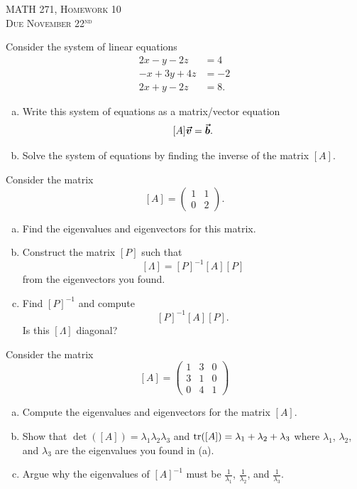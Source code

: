 \documentclass[12pt]{article} %
\begin{document}
\begin{center}
   \textsc{\large MATH 271, Homework 10}\\
   \textsc{Due November 22$^\textrm{nd}$}
\end{center}
\vspace{.5cm}

\begin{problem}
Consider the system of linear equations
\begin{align*}
    2x-y-2z&=4\\
    -x + 3y +4z &= -2\\
    2x+y-2z&=8.
\end{align*}
\begin{enumerate}[(a)]
    \item Write this system of equations as a matrix/vector equation
    \[
    [A]\boldsymbol{\vec{v}}=\boldsymbol{\vec{b}}.
    \]
    \item Solve the system of equations by finding the inverse of the matrix $[A]$.
\end{enumerate}
\end{problem}

\begin{problem}
Consider the matrix
\[
[A] = \begin{pmatrix} 1 & 1 \\ 0 & 2 \end{pmatrix}.
\]
\begin{enumerate}[(a)]
    \item Find the eigenvalues and eigenvectors for this matrix.
    \item Construct the matrix $[P]$ such that
    \[
    [\Lambda] = [P]^{-1}[A][P]
    \]
    from the eigenvectors you found. 
    \item Find $[P]^{-1}$ and compute
    \[
    [P]^{-1}[A][P].
    \]
    Is this $[\Lambda]$ diagonal?
\end{enumerate} 
\end{problem}

\begin{problem}
Consider the matrix
\[
[A]=\begin{pmatrix} 1 & 3 & 0 \\ 3 & 1 & 0 \\
 0 & 4 & 1 \end{pmatrix}
\]
\begin{enumerate}[(a)]
    \item Compute the eigenvalues and eigenvectors for the matrix $[A]$.
    \item Show that $\det([A])=\lambda_1\lambda_2\lambda_3$ and $\mathrm{tr}([A])=\lambda_1 + \lambda_2+\lambda_3$ where $\lambda_1$, $\lambda_2$, and $\lambda_3$ are the eigenvalues you found in (a).
    \item Argue why the eigenvalues of $[A]^{-1}$ must be $\frac{1}{\lambda_1}$, $\frac{1}{\lambda_2}$, and $\frac{1}{\lambda_3}$.
\end{enumerate}
\end{problem}
\end{document}
